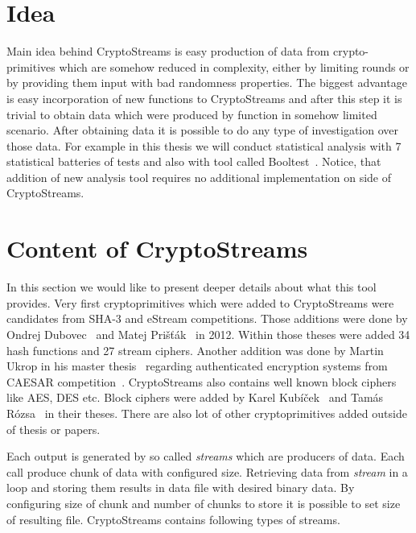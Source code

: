 \documentclass[
    digital,    %
    oneside,    %
    color,
    11pt,
    nocover,
    notable,
    nolof,
    nolot,
    final
]{fithesis3}
\begin{document}
\section{Idea}

Main idea behind CryptoStreams is easy production of data from crypto-primitives which are somehow reduced in complexity, either by limiting rounds or by providing them input with bad randomness properties. The biggest advantage is easy incorporation of new functions to CryptoStreams and after this step it is trivial to obtain data which were produced by function in somehow limited scenario. After obtaining data it is possible to do any type of investigation over those data. For example in this thesis we will conduct statistical analysis with 7 statistical batteries of tests and also with tool called Booltest~\cite{booltest-secrypt2017}. Notice, that addition of new analysis tool requires no additional implementation on side of CryptoStreams.

\section{Content of CryptoStreams}

In this section we would like to present deeper details about what this tool provides. Very first cryptoprimitives which were added to CryptoStreams were candidates from SHA-3 and eStream competitions. Those additions were done by Ondrej Dubovec~\cite{Dubovec2012thesis} and Matej Prišťák~\cite{Pristak2012thesis} in 2012. Within those theses were added 34 hash functions and 27 stream ciphers. Another addition was done by Martin Ukrop in his master thesis~\cite{Ukrop2016thesis} regarding authenticated encryption systems from CAESAR competition~\cite{caesar-competition}. CryptoStreams also contains well known block ciphers like AES, DES etc. Block ciphers were added by Karel Kubíček~\cite{Kubicek2017thesis} and Tamás Rózsa~\cite{Rozsa2018thesis} in their theses. There are also lot of other cryptoprimitives added outside of thesis or papers.


Each output is generated by so called \textit{streams} which are producers of data. Each call produce chunk of data with configured size. Retrieving data from \textit{stream} in a loop and storing them results in data file with desired binary data. By configuring size of chunk and number of chunks to store it is possible to set size of resulting file. CryptoStreams contains following types of streams.
\end{document}
